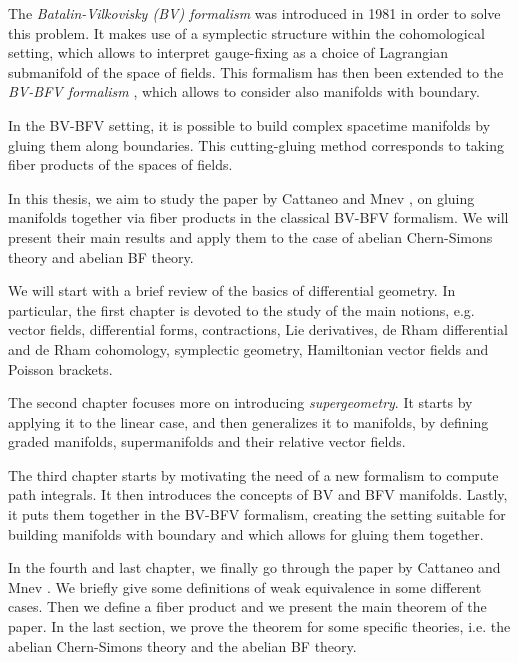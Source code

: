 The \emph{Batalin-Vilkovisky (BV) formalism} \cite{BV_1, BV_2} was introduced in 1981 in order to solve this problem.
It makes use of a symplectic structure within the cohomological setting, which allows to interpret gauge-fixing as a choice of Lagrangian submanifold of the space of fields.
This formalism has then been extended to the \emph{BV-BFV formalism} \cite{Mnfd_boundaries, mCME, Intro_BV-BFV}, which allows to consider also manifolds with boundary.

In the BV-BFV setting, it is possible to build complex spacetime manifolds by gluing them along boundaries.
This cutting-gluing method corresponds to taking fiber products of the spaces of fields.


In this thesis, we aim to study the paper by Cattaneo and Mnev \cite{Gluing_BV-BFV}, on gluing manifolds together via fiber products in the classical BV-BFV formalism.
We will present their main results and apply them to the case of abelian Chern-Simons theory and abelian BF theory.



We will start with a brief review of the basics of differential geometry.
In particular, the first chapter is devoted to the study of the main notions, e.g. vector fields, differential forms, contractions, Lie derivatives, de Rham differential and de Rham cohomology, symplectic geometry, Hamiltonian vector fields and Poisson brackets.

The second chapter focuses more on introducing \emph{supergeometry}.
It starts by applying it to the linear case, and then generalizes it to manifolds, by defining graded manifolds, supermanifolds and their relative vector fields.

The third chapter starts by motivating the need of a new formalism to compute path integrals.
It then introduces the concepts of BV and BFV manifolds.
Lastly, it puts them together in the BV-BFV formalism, creating the setting suitable for building manifolds with boundary and which allows for gluing them together.

In the fourth and last chapter, we finally go through the paper by Cattaneo and Mnev \cite{Gluing_BV-BFV}.
We briefly give some definitions of weak equivalence in some different cases.
Then we define a fiber product and we present the main theorem of the paper.
In the last section, we prove the theorem for some specific theories, i.e. the abelian Chern-Simons theory and the abelian BF theory.